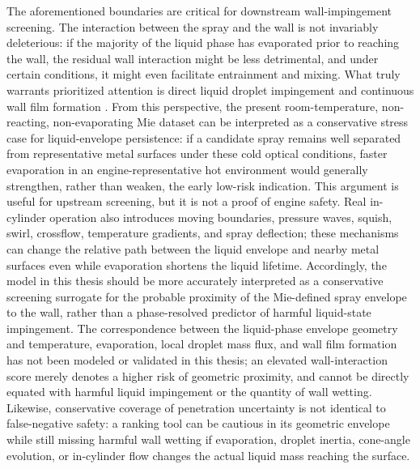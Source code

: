 The aforementioned boundaries are critical for downstream wall-impingement screening.
The interaction between the spray and the wall is not invariably deleterious: if the majority of the liquid phase has evaporated prior to reaching the wall, the residual wall interaction might be less detrimental, and under certain conditions, it might even facilitate entrainment and mixing.
What truly warrants prioritized attention is direct liquid droplet impingement and continuous wall film formation \cite{MorieiraMotaPanao2010,liu2024marine_impingement,peraza2022swi,ahmad2025fueldilution}.
From this perspective, the present room-temperature, non-reacting, non-evaporating Mie dataset can be interpreted as a conservative stress case for liquid-envelope persistence: if a candidate spray remains well separated from representative metal surfaces under these cold optical conditions, faster evaporation in an engine-representative hot environment would generally strengthen, rather than weaken, the early low-risk indication.
This argument is useful for upstream screening, but it is not a proof of engine safety.
Real in-cylinder operation also introduces moving boundaries, pressure waves, squish, swirl, crossflow, temperature gradients, and spray deflection; these mechanisms can change the relative path between the liquid envelope and nearby metal surfaces even while evaporation shortens the liquid lifetime.
Accordingly, the model in this thesis should be more accurately interpreted as a conservative screening surrogate for the probable proximity of the Mie-defined spray envelope to the wall, rather than a phase-resolved predictor of harmful liquid-state impingement.
The correspondence between the liquid-phase envelope geometry and temperature, evaporation, local droplet mass flux, and wall film formation has not been modeled or validated in this thesis;
an elevated wall-interaction score merely denotes a higher risk of geometric proximity, and cannot be directly equated with harmful liquid impingement or the quantity of wall wetting.
Likewise, conservative coverage of penetration uncertainty is not identical to false-negative safety: a ranking tool can be cautious in its geometric envelope while still missing harmful wall wetting if evaporation, droplet inertia, cone-angle evolution, or in-cylinder flow changes the actual liquid mass reaching the surface.

